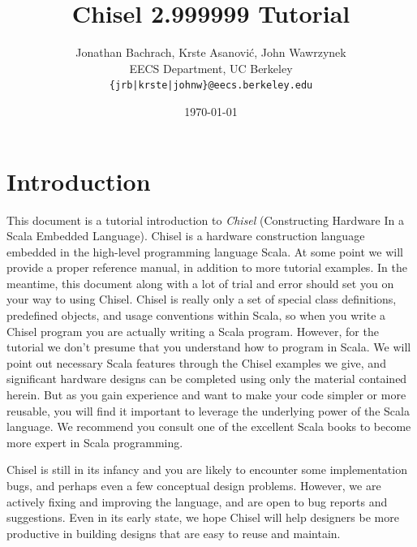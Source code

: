 \documentclass[twocolumn,10pt]{article}
\title{Chisel 2.999999 Tutorial}
\author{Jonathan Bachrach, Krste Asanovi\'{c}, John Wawrzynek \\
EECS Department, UC Berkeley\\
{\tt  \{jrb|krste|johnw\}@eecs.berkeley.edu}
}
\date{\today}
\begin{document}
\maketitle{}


\section{Introduction}

This document is a tutorial introduction to {\em Chisel} (Constructing
Hardware In a Scala Embedded Language).  Chisel is a hardware
construction language embedded in the high-level programming language
Scala.  At some point we will provide a proper reference manual, in
addition to more tutorial examples.  In the meantime, this document
along with a lot of trial and error should set you on your way to
using Chisel.  Chisel is really only a set of special class
definitions, predefined objects, and usage conventions within Scala,
so when you write a Chisel program you are actually writing a Scala
program.  However, for the tutorial we don't presume that you
understand how to program in Scala.  We will point out necessary Scala
features through the Chisel examples we give, and significant hardware
designs can be completed using only the material contained herein.
But as you gain experience and want to make your code simpler or more
reusable, you will find it important to leverage the underlying power
of the Scala language. We recommend you consult one of the excellent
Scala books to become more expert in Scala programming.

Chisel is still in its infancy and you are likely to encounter some
implementation bugs, and perhaps even a few conceptual design
problems.  However, we are actively fixing and improving the language,
and are open to bug reports and suggestions.  Even in its early state,
we hope Chisel will help designers be more productive in building
designs that are easy to reuse and maintain.
\end{document}
